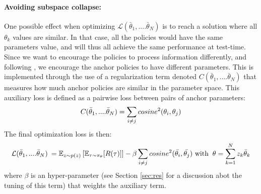\paragraph{Avoiding subspace collapse: } One possible effect when optimizing $\mathcal{L}(\bar{\theta}_1,....\bar{\theta}_N)$ is to reach a solution where all $\theta_k$ values are similar. In that case, all the policies would have the same parameters value, and will thus all achieve the same performance at test-time. Since we want to encourage the policies to process information differently, and following \cite{LearningSubspaces}, we encourage the anchor policies to have different parameters. This is implemented through the use of a regularization term  denoted $C(\bar{\theta}_1,....\bar{\theta}_N)$ that measures how much anchor policies are similar in the parameter space. This auxiliary loss is defined as a pairwise loss between pairs of anchor parameters:
\begin{equation}
    C(\bar{\theta}_1,....\bar{\theta}_N) = \sum\limits_{i \neq j} cosine^2(\theta_i,\theta_j)  \vspace{-0.1cm} 
\end{equation}
The final optimization loss is then:
\begin{equation*}
    \mathcal{L}(\bar{\theta}_1,....\bar{\theta}_N) \:=  \mathbb{E}_{z \sim p(z)} \left[ \mathbb{E}_{\tau \sim \pi_{\theta}}[R(\tau)] \right]  - \beta \sum\limits_{i \neq j} cosine^2(\bar{\theta_i},\bar{\theta_j}) \\
    \text{ with }\:\theta=\sum\limits_{k=1}^N z_k \bar{\theta}_k   \vspace{-0.15cm} 
\end{equation*}
where $\beta$ is an hyper-parameter (see Section \ref{sec:res} for a discussion abot the tuning of this term) that weights the auxiliary term. 


